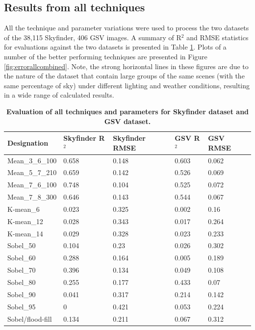 \documentclass[final,3p,times,authoryear]{elsarticle}
\begin{document}
\subsection{Results from all techniques}\label{sec:resultsall}
All the technique and parameter variations were used to process the two datasets of the 38,115 Skyfinder, 406 GSV images. A summary of R$^{2}$ and RMSE statistics for evaluations against the two datasets is presented in Table \ref{tab:evalall}. Plots of a number of the better performing techniques are presented in Figure \ref{fig:errorallcombined}. Note, the strong horizontal lines in these figures are due to the nature of the dataset that contain large groups of the same scenes (with the same percentage of sky) under different lighting and weather conditions, resulting in a wide range of calculated results.

\begin{table}[!htbp]
\caption{\bf Evaluation of all techniques and parameters for Skyfinder dataset and GSV dataset. \label{tab:evalall}}     
\begin{tabular}{ l  l l l l }
\textbf{Designation}  & \textbf{Skyfinder R$^{2}$} & \textbf{Skyfinder RMSE} & \textbf{GSV R$^{2}$} & \textbf{GSV RMSE}  \\ \hline
Mean\_3\_6\_100	&0.658&0.148&0.603&0.062 \\
Mean\_5\_7\_210	&0.659&0.142&0.526&0.069 \\
Mean\_7\_6\_100	&0.748&0.104&0.525&0.072 \\
Mean\_7\_8\_300 &0.646&0.143&0.544&0.067  \\
K-mean\_6       &0.023&0.325&0.002&0.16 \\
K-mean\_12      &0.028&0.343&0.017&0.264 \\
K-mean\_14      &0.029&0.328&0.023&0.233 \\
Sobel\_50       &0.104&0.23 &0.026&0.302 \\
Sobel\_60       &0.288&0.164&0.005&0.189 \\
Sobel\_70       &0.396&0.134&0.049&0.108 \\
Sobel\_80       &0.255&0.177&0.433&0.07  \\
Sobel\_90       &0.041&0.317&0.214&0.142 \\
Sobel\_95       &0    &0.421&0.053&0.224 \\
\hline
Sobel/flood-fill&0.134&0.211&0.067&0.312 \\
\hline
\end{tabular}
\end{table}
\end{document}
